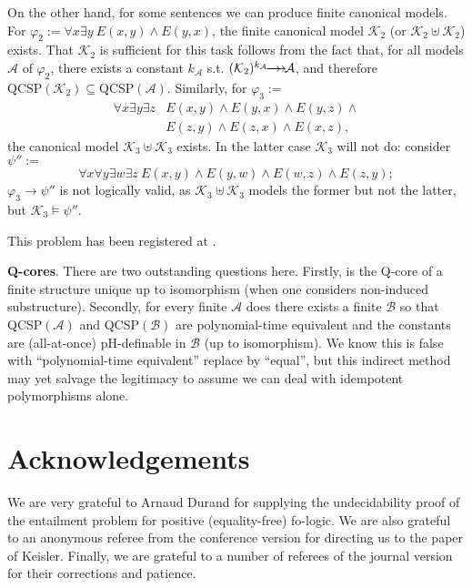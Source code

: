 \documentclass{LMCS}
\newcommand{\surhom}{
  \ensuremath{
      \negthinspace 
      \longrightarrow
      \hspace{-5mm} \rightarrow \hspace{1mm}
  }
}
\begin{document}
On the other hand, for some sentences we can produce finite canonical models. For $\varphi_2:= \forall x \exists y \ E(x,y) \wedge E(y,x)$, the finite canonical model $\mathcal{K}_2$ (or $\mathcal{K}_2 \uplus \mathcal{K}_2$) exists. That $\mathcal{K}_2$ is sufficient for this task follows from the fact that, for all models $\mathcal{A}$ of $\varphi_2$, there exists a constant $k_\mathcal{A}$ s.t. $(\mathcal{K}_2)^{k_\mathcal{A}} {\surhom} \mathcal{A}$, and therefore $\mathrm{QCSP}(\mathcal{K}_2) \subseteq \mathrm{QCSP}(\mathcal{A})$. Similarly, for $\varphi_3:=$
\[
\begin{array}{ll}
\forall x \exists y \exists z & E(x,y) \wedge E(y,x) \wedge E(y,z) \wedge \\
& E(z,y) \wedge E(z,x) \wedge E(x,z), 
\end{array}
\]
the canonical model $\mathcal{K}_3 \uplus \mathcal{K}_3$ exists. In the latter case $\mathcal{K}_3$ will not do: consider $\psi'':=$ 
\[ \forall x \forall y \exists w\exists z \ E(x,y) \wedge E(y,w) \wedge E(w,z) \wedge E(z,y); \]
$\varphi_3 \rightarrow \psi''$ is not logically valid, as $\mathcal{K}_3 \uplus \mathcal{K}_3$ models the former but not the latter, but $\mathcal{K}_3 \models \psi''$. 

This problem has been registered at \cite{FMT-open-problem-garden}.

\textbf{Q-cores}.
There are two outstanding questions here. Firstly, is the Q-core of a finite structure unique up to isomorphism (when one considers non-induced substructure). Secondly, for every finite $\mathcal{A}$ does there exists a finite $\mathcal{B}$ so that QCSP$(\mathcal{A})$ and QCSP$(\mathcal{B})$ are polynomial-time equivalent and the constants are (all-at-once) pH-definable in $\mathcal{B}$ (up to isomorphism). We know this is false with ``polynomial-time equivalent'' replace by ``equal'', but this indirect method may yet salvage the legitimacy to assume we can deal with idempotent polymorphisms alone.

\section*{Acknowledgements}

We are very grateful to Arnaud Durand for supplying the undecidability proof of the entailment problem for positive (equality-free) fo-logic. We are also grateful to an anonymous referee from the conference version for directing us to the paper of Keisler. Finally, we are grateful to a number of referees of the journal version for their corrections and patience.
\end{document}
